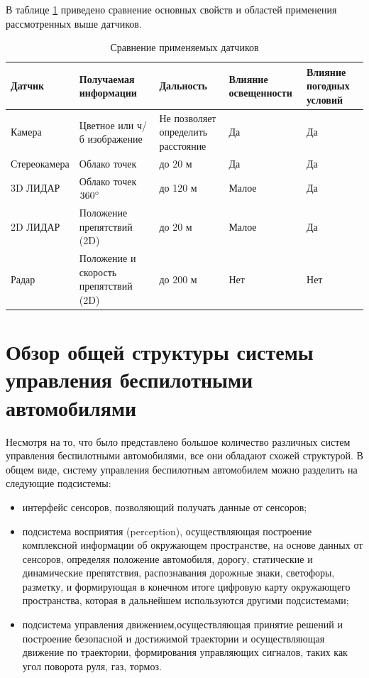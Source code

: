 В таблице \ref{tab:sensors_compare} приведено сравнение основных свойств и областей применения рассмотренных
выше датчиков.

\begin{table}[h]
    \caption{Сравнение применяемых датчиков}
    \label{tab:sensors_compare}
    \begin{tabularx}{\textwidth}{|X|X|X|X|X|}
        \hline
        Датчик        & Получаемая информации & Дальность & Влияние освещенности & Влияние погодных условий  \\
        \hline
        Камера        & Цветное или ч/б изображение & Не позволяет определить расстояние  & Да & Да \\
        \hline
        Стереокамера  & Облако точек & до 20 м & Да & Да \\
        \hline
        3D ЛИДАР      & Облако точек $360^{\circ}$  & до 120 м  & Малое & Да \\
        \hline
        2D ЛИДАР      & Положение препятствий (2D) & до 20 м \cite{jetson_car_zed} & Малое & Да \\
        \hline
        Радар         & Положение и скорость препятствий (2D) & до 200 м & Нет & Нет \\
        \hline
    \end{tabularx}
\end{table}

\section{Обзор общей структуры системы управления беспилотными автомобилями}

Несмотря на то, что было представлено большое количество различных систем управления беспилотными
автомобилями, все они обладают схожей структурой. В общем виде, систему управления беспилотным автомобилем
можно разделить на следующие подсистемы:
\begin{itemize}
    \item интерфейс сенсоров, позволяющий получать данные от сенсоров;
    \item подсистема восприятия (perception), осуществляющая построение комплексной информации об
          окружающем пространстве, на основе данных от сенсоров, определяя положение автомобиля,
          дорогу, статические и динамические препятствия, распознавания дорожные знаки, светофоры, разметку,
          и формирующая в конечном итоге цифровую карту окружающего пространства, которая в дальнейшем
          используются другими подсистемами;
    \item подсистема управления движением,осуществляющая принятие решений и построение безопасной
          и достижимой траектории и осуществляющая движение по траектории, формирования управляющих сигналов,
          таких как угол поворота руля, газ, тормоз.
\end{itemize}

